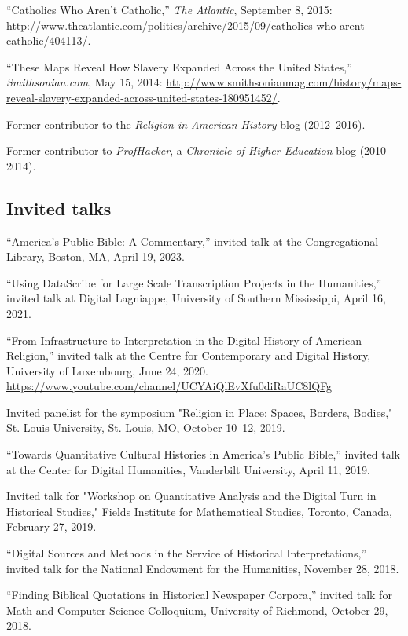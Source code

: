 \documentclass[11pt]{article}
\begin{document}
``Catholics Who Aren't Catholic,'' \emph{The Atlantic}, September 8, 2015:  \url{http://www.theatlantic.com/politics/archive/2015/09/catholics-who-arent-catholic/404113/}.

``These Maps Reveal How Slavery Expanded Across the United States,'' \emph{Smithsonian.com}, May 15, 2014: \url{http://www.smithsonianmag.com/history/maps-reveal-slavery-expanded-across-united-states-180951452/}.

Former contributor to the \emph{Religion in American History} blog (2012--2016).

Former contributor to \emph{ProfHacker}, a \emph{Chronicle of Higher Education} blog (2010--2014). 

\subsection{Invited talks}\label{Invited talks}

``America's Public Bible: A Commentary,'' invited talk at the Congregational Library, Boston, MA, April 19, 2023.

``Using DataScribe for Large Scale Transcription Projects in the Humanities,'' invited talk at Digital Lagniappe, University of Southern Mississippi, April 16, 2021.

``From Infrastructure to Interpretation in the Digital History of American Religion,'' invited talk at the Centre for Contemporary and Digital History, University of Luxembourg, June 24, 2020. \url{https://www.youtube.com/channel/UCYAiQlEvXfu0diRaUC8lQFg}

Invited panelist for the symposium "Religion in Place: Spaces, Borders, Bodies," St. Louis University, St. Louis, MO, October 10--12, 2019.

``Towards Quantitative Cultural Histories in America's Public Bible,'' invited talk at the Center for Digital Humanities, Vanderbilt University, April 11, 2019.

Invited talk for "Workshop on Quantitative Analysis and the Digital Turn in Historical Studies," Fields Institute for Mathematical Studies, Toronto, Canada, February 27, 2019.

``Digital Sources and Methods in the Service of Historical Interpretations,'' invited talk for the National Endowment for the Humanities, November 28, 
2018.

``Finding Biblical Quotations in Historical Newspaper Corpora,'' invited talk for Math and Computer Science Colloquium, University of Richmond, October 29, 2018.
\end{document}
